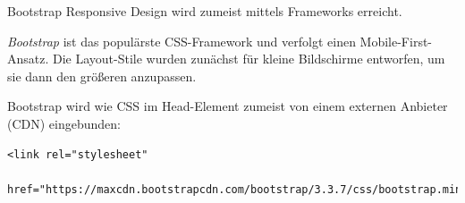 \begin{bonus}{Bootstrap}
    Responsive Design wird zumeist mittels Frameworks erreicht.

    \emph{Bootstrap} ist das populärste CSS-Framework und verfolgt einen Mobile-First-Ansatz.
    Die Layout-Stile wurden zunächst für kleine Bildschirme entworfen, um sie dann den größeren anzupassen.

    Bootstrap wird wie CSS im Head-Element zumeist von einem externen Anbieter (CDN) eingebunden:
    \begin{lstlisting}[language=HTML5]
        <link rel="stylesheet" 
            href="https://maxcdn.bootstrapcdn.com/bootstrap/3.3.7/css/bootstrap.min.css">
    \end{lstlisting}
\end{bonus}